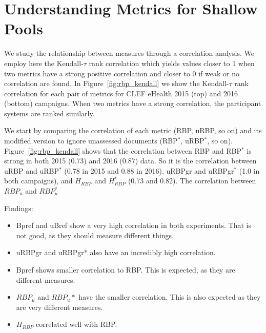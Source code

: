
\section{Understanding Metrics for Shallow Pools}
\label{sec:metric_correlations}


We study the relationship between measures through a correlation analysis. %
We employ here the Kendall-$\tau$ rank correlation which yields values closer to 1 when two metrics have a strong positive correlation and closer to 0 if weak or no correlation are found.
In Figure~\ref{fig:rbp_kendall} we show the Kendall-$\tau$ rank correlation for each pair of metrics for CLEF eHealth 2015 (top) and 2016 (bottom) campaigns.
When two metrics have a strong correlation, the participant systems are ranked similarly. 

We start by comparing the correlation of each metric (RBP, uRBP, so on) and its modified version to ignore unassessed documents (RBP$^*$, uRBP$^*$, so on).
Figure~\ref{fig:rbp_kendall} shows that the correlation between RBP and RBP$^*$ is strong in both 2015 (0.73) and 2016 (0.87) data. So it is the correlation between uRBP and uRBP$^*$ (0.78 in 2015 and 0.88 in 2016), uRBPgr and uRBPgr$^*$ (1.0 in both campaigns), and $H_{RBP}$ and $H_{RBP}^*$ (0.73 and 0.82). The correlation between $RBP_u$ and $RBP_u^*$



Findings:
\begin{itemize}
\item Bpref and uBref show a very high correlation in both experiments. That is not good, as they should measure different things.  
\item uRBPgr and uRBPgr* also have an incredibly high correlation.
\item Bpref shows smaller correlation to RBP. This is expected, as they are different measures.
\item $RBP_u$ and $RBP_u*$ have the smaller correlation. This is also expected as they are very different measures.
\item $H_{RBP}$ correlated well with RBP. 
\end{itemize}

